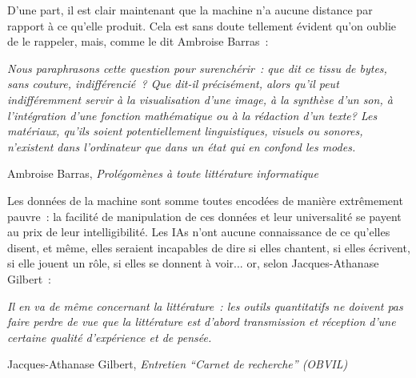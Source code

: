 \documentclass{article}
\newenvironment{citationbox}
{\begin{center}
		\begin{minipage}{.8\textwidth}
		}
		{
		\end{minipage}	
\end{center}
}
\begin{document}
				D'une part, il est clair maintenant que la machine n'a aucune distance par rapport à ce qu'elle produit. Cela est sans doute tellement évident qu'on oublie de le rappeler, mais, comme le dit  Ambroise Barras~:
				\begin{citationbox}
					\textit{Nous paraphrasons cette question pour surenchérir~: que dit ce
						tissu de bytes, sans couture, indifférencié~? Que dit-il précisément, alors
						qu'il peut indifféremment servir à la visualisation d'une image, à la
						synthèse d'un son, à l'intégration d'une fonction mathématique ou à la
						rédaction d'un texte? Les matériaux, qu'ils soient potentiellement
						linguistiques, visuels ou sonores, n'existent dans l'ordinateur que dans
						un état qui en confond les modes.}
					\begin{flushright}
						Ambroise Barras, \textit{Prolégomènes à toute littérature informatique} \cite{barras1995}
					\end{flushright}
				\end{citationbox}
				Les données de la machine sont somme toutes encodées de manière extrêmement pauvre~: la facilité de manipulation de ces données et leur universalité se payent au prix de leur intelligibilité. Les IAs n'ont aucune connaissance de ce qu'elles disent, et même, elles seraient incapables de dire si elles chantent, si elles écrivent, si elle jouent un rôle, si elles se donnent à voir... or, selon Jacques-Athanase Gilbert~:
				\begin{citationbox}
					\textit{Il en va de même concernant la littérature~: les outils quantitatifs ne doivent pas faire perdre de vue que la littérature est d’abord transmission et réception d’une certaine qualité d’expérience et de pensée.}
					\begin{flushright}
						Jacques-Athanase Gilbert, \textit{Entretien ``Carnet de recherche'' (OBVIL)} \cite{gilbert2018}
					\end{flushright}
				\end{citationbox}
				
\end{document}
